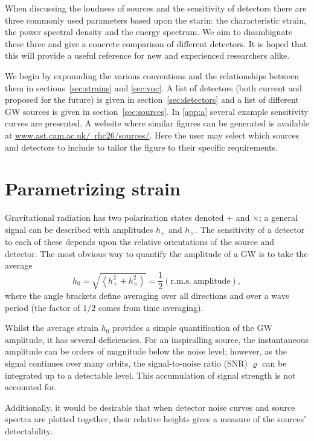 \documentclass[fleqn,12pt]{iopart}
\begin{document}
When discussing the loudness of sources and the sensitivity of detectors there are three commonly used parameters based upon the starin: the characteristic strain, the power spectral density and the energy spectrum. We aim to disambiguate these three and give a concrete comparison of different detectors. It is hoped that this will provide a useful reference for new and experienced researchers alike.

We begin by expounding the various conventions and the relationships between them in sections~\ref{sec:strains} and \ref{sec:voc}. A list of detectors (both current and proposed for the future) is given in section~\ref{sec:detectors} and a list of different GW sources is given in section~\ref{sec:sources}. In \ref{app:a} several example sensitivity curves are presented. A website where similar figures can be generated is available at \href{http://www.ast.cam.ac.uk/~rhc26/sources/}{www.ast.cam.ac.uk/~rhc26/sources/}. Here the user may select which sources and detectors to include to tailor the figure to their specific requirements.

\section{Parametrizing strain}

Gravitational radiation has two polarisation states denoted $+$ and $\times$; a general signal can be described with amplitudes $h_{+}$ and $h_{\times}$. The sensitivity of a detector to each of these depends upon the relative orientations of the source and detector. The most obvious way to quantify the amplitude of a GW is to take the average
\begin{equation}\label{eq:h0}
h_{0} = \sqrt{\left< h_{+}^{2}+h_{\times}^{2} \right>} = \frac{1}{2}\left( \mathrm{r.m.s.\ amplitude} \right),
\end{equation}
where the angle brackets define averaging over all directions and over a wave period (the factor of $1/2$ comes from time averaging).

Whilst the average strain $h_0$ provides a simple quantification of the GW amplitude, it has several deficiencies. For an inspiralling source, the instantaneous amplitude can be orders of magnitude below the noise level; however, as the signal continues over many orbits, the signal-to-noise ratio (SNR) $\varrho$ can be integrated up to a detectable level. This accumulation of signal strength is not accounted for.

Additionally, it would be desirable that when detector noise curves and source spectra are plotted together, their relative heights gives a measure of the sources' detectability.
\end{document}
